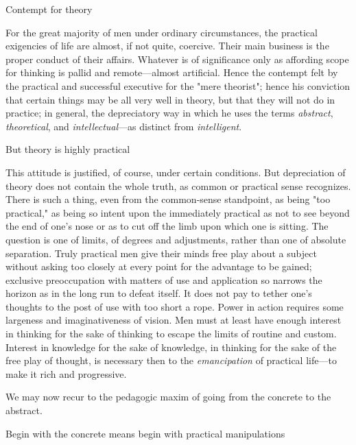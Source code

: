 \documentclass[letterpaper]{book}
\begin{document}
Contempt for theory

For the great majority of men under ordinary circumstances, the
practical exigencies of life are almost, if not quite, coercive. Their
main business is the proper conduct of their affairs. Whatever is of
significance only as affording scope for thinking is pallid and
remote---almost artificial. Hence the contempt felt by the practical and
successful executive for the "mere theorist"; hence his conviction that
certain things may be all very well in theory, but that they will not do
in practice; in general, the depreciatory way in which he uses the terms
\emph{abstract}, \emph{theoretical}, and \emph{intellectual}---as
distinct from \emph{intelligent}.

But theory is highly practical

This attitude is justified, of course, under certain conditions. But
depreciation of theory does not contain the whole truth, as common or
practical sense recognizes. There is such a thing, even from the
common-sense standpoint, as being "too practical," as being so intent
upon the immediately practical as not to
see
beyond the end of one's nose or as to cut off the limb upon which one is
sitting. The question is one of limits, of degrees and adjustments,
rather than one of absolute separation. Truly practical men give their
minds free play about a subject without asking too closely at every
point for the advantage to be gained; exclusive preoccupation with
matters of use and application so narrows the horizon as in the long run
to defeat itself. It does not pay to tether one's thoughts to the post
of use with too short a rope. Power in action requires some largeness
and imaginativeness of vision. Men must at least have enough interest in
thinking for the sake of thinking to escape the limits of routine and
custom. Interest in knowledge for the sake of knowledge, in thinking for
the sake of the free play of thought, is necessary then to the
\emph{emancipation} of practical life---to make it rich and progressive.

We may now recur to the pedagogic maxim of going from the concrete to
the abstract.

Begin with the concrete means begin with practical manipulations
\end{document}

